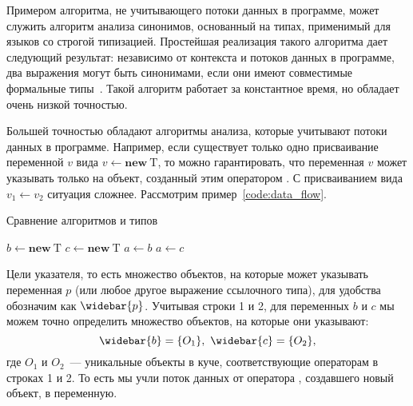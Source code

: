 \documentclass[14pt,titlepage,draft]{extarticle}
\newcommand{\type}[1]{\mathrm{#1}}
\newcommand{\op}[1]{\mathbf{#1}}
\newcommand{\pts}[1]{\widebar{#1}}
\begin{document}
        Примером алгоритма, не учитывающего потоки данных в программе, может
        служить алгоритм анализа синонимов, основанный на типах, применимый
        для языков со строгой типизацией.
        Простейшая реализация такого алгоритма дает следующий результат:
        независимо от контекста и потоков данных в программе, два выражения
        могут быть синонимами, если они имеют совместимые формальные
        типы~\cite[раздел~2.2]{diwan_tbaa}.
        Такой алгоритм работает за константное время, но обладает очень низкой
        точностью.

        Большей точностью обладают алгоритмы анализа, которые учитывают потоки
        данных в программе.
        Например, если существует только одно присваивание переменной $v$ вида
        $v \gets \op{new}~\type{T}$, то можно гарантировать, что переменная $v$
        может указывать только на объект, созданный этим оператором .
        С присваиванием вида $v_1 \gets v_2$ ситуация сложнее. Рассмотрим
        пример~\ref{code:data_flow}.

        \begin{algorithm}
          \caption{Сравнение алгоритмов  и
                                         типов}
          \label{code:data_flow}
          \begin{algorithmic}[1]
            \State $b \gets \op{new}~\type{T}$
            \State $c \gets \op{new}~\type{T}$
            \State $a \gets b$
            \State $a \gets c$
          \end{algorithmic}
        \end{algorithm}

        Цели указателя, то есть множество объектов, на которые может указывать
        переменная $p$ (или любое другое выражение ссылочного типа), для
        удобства обозначим как $\pts{p}$.
        Учитывая строки 1 и 2, для переменных $b$ и $c$ мы можем точно
        определить множество объектов, на которые они указывают:
        \[\pts{b} = \{O_1\},\ \pts{c} = \{O_2\},\]
        где $O_1$ и $O_2$~--- уникальные объекты в куче, соответствующие
        операторам  в строках 1 и 2. То есть мы учли поток данных от
        оператора , создавшего новый объект, в переменную.
\end{document}
